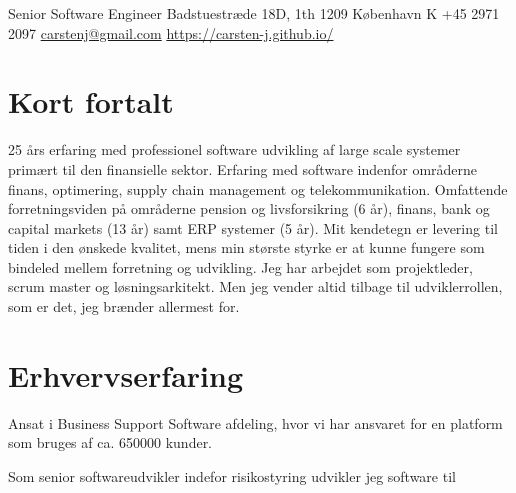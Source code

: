 \documentclass[10pt, a4paper]{article}
\begin{document}
{Senior Software Engineer}
{Badstuestræde 18D, 1th}
{1209 København K}
{+45 2971 2097}
{\href{mailto:carstenj@gmail.com}{carstenj@gmail.com}}
{\href{https://carsten-j.github.io/}{https://carsten-j.github.io/}}
\section{Kort fortalt}
25 års erfaring med professionel software udvikling af large scale systemer primært til den finansielle sektor. Erfaring med software indenfor områderne finans, optimering, supply chain management og telekommunikation. Omfattende forretningsviden på områderne pension og livsforsikring (6 år), finans, bank og capital markets (13 år) samt ERP systemer (5 år). Mit kendetegn er levering til tiden i den ønskede kvalitet, mens min største styrke er at kunne fungere som bindeled mellem forretning og udvikling. Jeg har arbejdet som projektleder, scrum master og løsningsarkitekt. Men jeg vender altid tilbage til udviklerrollen, som er det, jeg brænder allermest for.

\section{Erhvervserfaring}

{Ansat i Business Support Software afdeling, hvor vi har ansvaret for en platform som bruges af ca. 650000 kunder.
}
{
}

{Som senior softwareudvikler indefor risikostyring udvikler jeg software til
}
{
}
\end{document}
